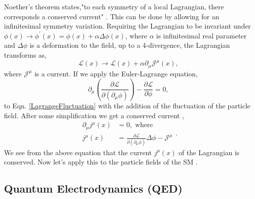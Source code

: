  Noether's theorem states,"to each symmetry of a local Lagrangian, there corresponds a conserved current" \cite{peskin_introduction_1995}. This can be done by allowing for an infinitesimal symmetry variation. Requiring the Lagrangian to be invariant under $\phi(x)\rightarrow\phi^\prime(x)=\phi(x)+\alpha\Delta\phi(x)$, where $\alpha$ is infinitesimal real parameter and $\Delta\phi$ is a deformation to the field, up to a 4-divergence, the Lagrangian transforms as,
 \begin{equation}\label{LagrangeFluctuation}
 \mathcal{L}(x)\rightarrow\mathcal{L}(x)+\alpha\partial_\mu\mathcal{J}^\mu(x),
 \end{equation}
 where $\mathcal{J}^\mu$ is a current. If we apply the Euler-Lagrange equation,
 \begin{equation}
 \partial_\mu(\frac{\partial\mathcal{L}}{\partial(\partial_\mu\phi)})-\frac{\partial\mathcal{L}}{\partial\phi}=0,
 \end{equation}
 to Eqn. \ref{LagrangeFluctuation} with the addition of the fluctuation of the particle field. After some simplification we get a conserved current \cite{halzen_quarks_1984, peskin_introduction_1995},
 \begin{equation}
 \begin{split}
 \partial_\mu j^\mu(x)&=0, \text{ where}\\
 j^\mu(x)&=\frac{\partial\mathcal{L}}{\partial(\partial_\mu\phi)}\Delta\phi-\mathcal{J}^\mu
 \end{split}.
 \end{equation} We see from the above equation that the current $j^\mu(x)$ of the Lagrangian is conserved. Now let's apply this to the particle fields of the SM \cite{halzen_quarks_1984, peskin_introduction_1995}.
 
 \subsection{Quantum Electrodynamics (QED)}
 
